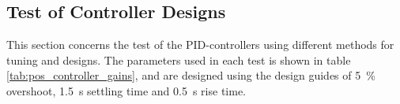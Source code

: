 \documentclass[../../main.tex]{subfiles}
\begin{document}
\subsection{Test of Controller Designs}\label{subsec:testControllerDesign}
This section concerns the test of the PID-controllers using different methods for tuning and designs. The parameters used in each test is shown in table \ref{tab:pos_controller_gains}, and are designed using the design guides of \SI{5}{\percent} overshoot, \SI{1,5}{\second} settling time and \SI{0,5}{\second} rise time.
\end{document}
